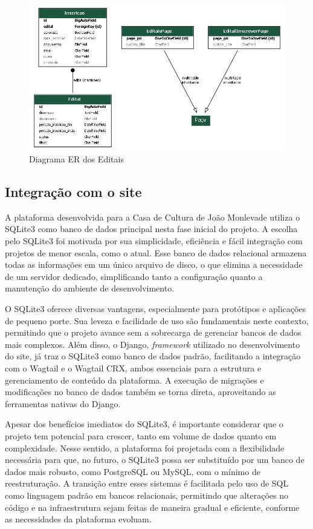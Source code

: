 \begin{figure}[htb]
	\caption{\label{fig_er_editais}Diagrama ER dos Editais}
	\begin{center}
	    \includegraphics[scale=0.5]{./img/er_diagram_editais.png}
	\end{center}
\end{figure}


\subsection{Integração com o site}

A plataforma desenvolvida para a Casa de Cultura de João Monlevade utiliza o SQLite3 como banco de dados principal nesta fase inicial do projeto. A escolha pelo SQLite3 foi motivada por sua simplicidade, eficiência e fácil integração com projetos de menor escala, como o atual. Esse banco de dados relacional armazena todas as informações em um único arquivo de disco, o que elimina a necessidade de um servidor dedicado, simplificando tanto a configuração quanto a manutenção do ambiente de desenvolvimento.

O SQLite3 oferece diversas vantagens, especialmente para protótipos e aplicações de pequeno porte. Sua leveza e facilidade de uso são fundamentais neste contexto, permitindo que o projeto avance sem a sobrecarga de gerenciar bancos de dados mais complexos. Além disso, o Django, \textit{framework} utilizado no desenvolvimento do site, já traz o SQLite3 como banco de dados padrão, facilitando a integração com o Wagtail e o Wagtail CRX, ambos essenciais para a estrutura e gerenciamento de conteúdo da plataforma. A execução de migrações e modificações no banco de dados também se torna direta, aproveitando as ferramentas nativas do Django.

Apesar dos benefícios imediatos do SQLite3, é importante considerar que o projeto tem potencial para crescer, tanto em volume de dados quanto em complexidade. Nesse sentido, a plataforma foi projetada com a flexibilidade necessária para que, no futuro, o SQLite3 possa ser substituído por um banco de dados mais robusto, como PostgreSQL ou MySQL, com o mínimo de reestruturação. A transição entre esses sistemas é facilitada pelo uso de SQL como linguagem padrão em bancos relacionais, permitindo que alterações no código e na infraestrutura sejam feitas de maneira gradual e eficiente, conforme as necessidades da plataforma evoluam.